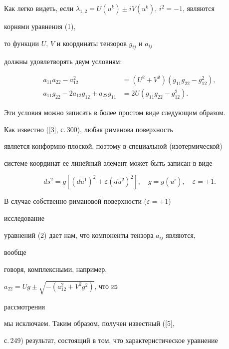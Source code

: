  


Как легко видеть, если $\lambda_{1,2}=U(u^k)\pm iV(u^k)$, $i^2=-1$, являются 


корнями уравнения (1), 


то функции $U$, $V$ и координаты тензоров $g_{ij}$ и $a_{ij}$ 


должны удовлетворять двум условиям: 


\begin{equation} 


\begin{split} 


a_{11}a_{22}-a^2_{12}&=(U^2+V^2)(g_{11}g_{22}-g^2_{12}),\\ 


a_{11}g_{22}-2a_{12}g_{12}+a_{22}g_{11}&=2U(g_{11}g_{22}- 


g^2_{12}). 


\end{split} 


\end{equation} 


Эти условия можно записать в более простом виде следующим образом.


Как известно ([3], с.\,300), любая риманова поверхность  


является конформно-плоской, поэтому в специальной (изотермической) 


системе координат ее линейный элемент может быть записан в виде 


$$ 


ds^2=g[(du^1)^2+\varepsilon(du^2)^2],\quad 


g=g(u^i),\quad \varepsilon=\pm 1. 


$$ 


 


В случае собственно римановой поверхности ($\varepsilon=+1$) 


исследование  


уравнений (2) дает нам, что компоненты тензора $a_{ij}$ являются, 


вообще 


говоря, комплексными, например,


$a_{22}=U g\pm\sqrt{-(a^2_{12}+V^2g^2)}$, что из 


рассмотрения 


мы исключаем. Таким образом, получен известный ([5], 


с.\,249) результат, состоящий в том, что характеристическое уравнение  


